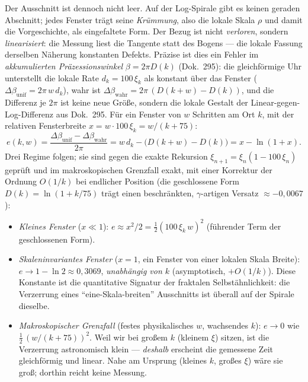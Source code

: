 Der Ausschnitt ist dennoch nicht leer. Auf der Log-Spirale gibt es keinen geraden
Abschnitt; jedes Fenster trägt seine \emph{Krümmung}, also die lokale Skala $\rho$ und
damit die Vorgeschichte, als eingefaltete Form. Der Bezug ist nicht \emph{verloren},
sondern \emph{linearisiert}: die Messung liest die Tangente statt des Bogens --- die lokale
Fassung derselben Näherung konstanten Defekts. Präzise ist dies ein Fehler im \emph{akkumulierten
Präzessionswinkel} $\beta = 2\pi D(k)$ (Dok.~295): die gleichförmige Uhr unterstellt die
lokale Rate $d_k = 100\,\xi_k$ als konstant über das Fenster ($\Delta\beta_{\text{unif}} =
2\pi\,w\,d_k$), wahr ist $\Delta\beta_{\text{wahr}} = 2\pi\,(D(k{+}w)-D(k))$, und die
Differenz je $2\pi$ ist keine neue Größe, sondern die lokale Gestalt der
Linear-gegen-Log-Differenz aus Dok.~295. Für ein Fenster von $w$ Schritten am Ort $k$, mit
der relativen Fensterbreite $x = w\cdot 100\,\xi_k = w/(k+75)$:
\begin{equation}
e(k,w) = \frac{\Delta\beta_{\text{unif}} - \Delta\beta_{\text{wahr}}}{2\pi}
       = w\,d_k - \big(D(k{+}w)-D(k)\big) = x - \ln(1+x).
\end{equation}
Drei Regime folgen; sie sind gegen die exakte Rekursion $\xi_{n+1}=\xi_n(1-100\,\xi_n)$
geprüft und im makroskopischen Grenzfall exakt, mit einer Korrektur der Ordnung $O(1/k)$ bei
endlicher Position (die geschlossene Form $D(k)=\ln(1+k/75)$ trägt einen beschränkten,
$\gamma$-artigen Versatz $\approx-0{,}0067$):
\begin{itemize}
\item \emph{Kleines Fenster} ($x\ll1$): $e \approx x^2/2 = \tfrac12(100\,\xi_k\,w)^2$
(führender Term der geschlossenen Form).
\item \emph{Skaleninvariantes Fenster} ($x=1$, ein Fenster von einer lokalen Skala Breite):
$e \to 1-\ln 2 \approx 0{,}3069$, \emph{unabhängig von $k$} (asymptotisch, $+O(1/k)$). Diese
Konstante ist die quantitative Signatur der fraktalen Selbstähnlichkeit: die Verzerrung eines
\enquote{eine-Skala-breiten} Ausschnitts ist überall auf der Spirale dieselbe.
\item \emph{Makroskopischer Grenzfall} (festes physikalisches $w$, wachsendes $k$):
$e \to 0$ wie $\tfrac12\,(w/(k+75))^2$. Weil wir bei großem $k$ (kleinem $\xi$) sitzen, ist
die Verzerrung astronomisch klein --- \emph{deshalb} erscheint die gemessene Zeit
gleichförmig und linear. Nahe am Ursprung (kleines $k$, großes $\xi$) wäre sie groß;
dorthin reicht keine Messung.
\end{itemize}

